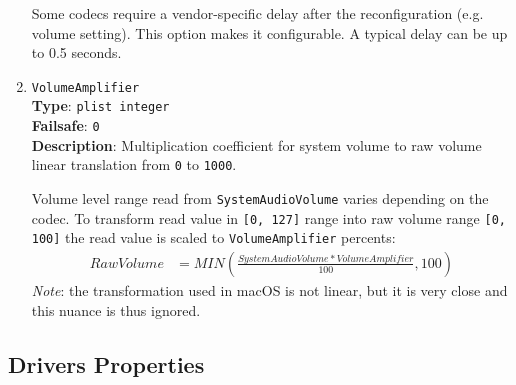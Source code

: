 \documentclass[]{article}
\begin{document}
\begin{enumerate}
  Some codecs require a vendor-specific delay after the reconfiguration
  (e.g. volume setting). This option makes it configurable. A typical
  delay can be up to 0.5 seconds.

\item
  \texttt{VolumeAmplifier}\\
  \textbf{Type}: \texttt{plist\ integer}\\
  \textbf{Failsafe}: \texttt{0}\\
  \textbf{Description}: Multiplication coefficient for system volume to raw volume linear translation
  from \texttt{0} to \texttt{1000}.

  Volume level range read from \texttt{SystemAudioVolume} varies depending on the codec.
  To transform read value in \texttt{[0, 127]} range into raw volume range \texttt{[0, 100]}
  the read value is scaled to \texttt{VolumeAmplifier} percents:
  \begin{align*}
      RawVolume &= MIN(\frac{SystemAudioVolume * VolumeAmplifier}{100}, 100)
  \end{align*}
  \emph{Note}: the transformation used in macOS is not linear, but it is very close
  and this nuance is thus ignored.

\end{enumerate}

\subsection{Drivers Properties}\label{uefidriversprops}
\end{document}

